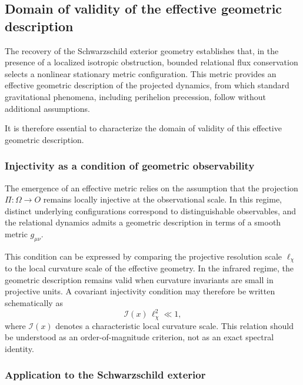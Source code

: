 \subsection{Domain of validity of the effective geometric description}
  \label{sec:injectivity-domain}

  The recovery of the Schwarzschild exterior geometry establishes that, in the
  presence of a localized isotropic obstruction, bounded relational flux conservation
  selects a nonlinear stationary metric configuration.
  This metric provides an effective geometric description of the projected dynamics,
  from which standard gravitational phenomena, including perihelion precession,
  follow without additional assumptions.

  It is therefore essential to characterize the domain of validity of this effective
  geometric description.

  \subsubsection*{Injectivity as a condition of geometric observability}

    The emergence of an effective metric relies on the assumption that the projection
    $\Pi : \Omega \to O$ remains locally injective at the observational scale.
    In this regime, distinct underlying configurations correspond to distinguishable
    observables, and the relational dynamics admits a geometric description in terms of
    a smooth metric $g_{\mu\nu}$.

    This condition can be expressed by comparing the projective resolution scale
    $\ell_\chi$ to the local curvature scale of the effective geometry.
    In the infrared regime, the geometric description remains valid when curvature
    invariants are small in projective units.
    A covariant injectivity condition may therefore be written schematically as
    \begin{equation}
      \mathcal{I}(x)\,\ell_\chi^2 \ll 1,
      \label{eq:injectivity-invariant}
    \end{equation}
    where $\mathcal{I}(x)$ denotes a characteristic local curvature scale.
    This relation should be understood as an order-of-magnitude criterion,
    not as an exact spectral identity.

  \subsubsection*{Application to the Schwarzschild exterior}


